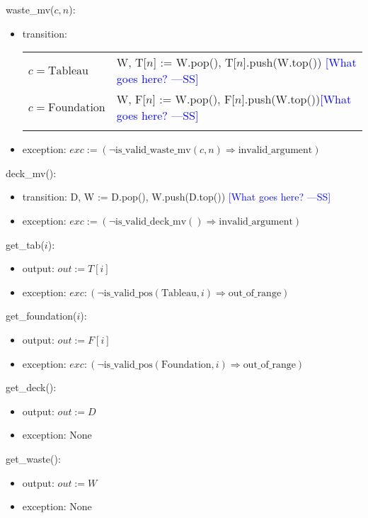 \documentclass[12pt]{article}
\newcommand{\authornote}[3]{\textcolor{#1}{[#3 ---#2]}}
\newcommand{\authornote}[3]{}
\newcommand{\wss}[1]{\authornote{blue}{SS}{#1}}
\begin{document}
\noindent waste\_mv($c, n$):
\begin{itemize}
\item transition:

\begin{tabular}{|p{3cm}|l|}
\hhline{|-|-|}
$c = \mbox{Tableau}$ & W, T[$n$] := W.pop(), T[$n$].push(W.top()) \wss{What goes here?}\\
\hhline{|-|-|}
$c = \mbox{Foundation}$ & W, F[$n$] := W.pop(), F[$n$].push(W.top())\wss{What goes here?}\\
\hhline{|-|-|}
\end{tabular}

\item exception:
  $exc := (\neg \text{is\_valid\_waste\_mv}(c, n) \Rightarrow
  \text{invalid\_argument})$

\end{itemize}

\noindent deck\_mv():
\begin{itemize}
\item transition: D, W := D.pop(), W.push(D.top()) \wss{What goes here?}
\item exception:
  $exc := (\neg \text{is\_valid\_deck\_mv}() \Rightarrow \text{invalid\_argument})$
\end{itemize}

\noindent get\_tab($i$):
\begin{itemize}
\item output: $out := T[i]$
\item exception: $exc : (\neg \text{is\_valid\_pos}(\text{Tableau}, i) \Rightarrow \text{out\_of\_range})$
\end{itemize}

\noindent get\_foundation($i$):
\begin{itemize}
\item output: $out := F[i]$
\item exception: $exc : (\neg \text{is\_valid\_pos}(\text{Foundation}, i) \Rightarrow \text{out\_of\_range})$
\end{itemize}

\noindent get\_deck():
\begin{itemize}
\item output: $out := D$
\item exception: None
\end{itemize}

\noindent get\_waste():
\begin{itemize}
\item output: $out := W$
\item exception: None
\end{itemize}
\end{document}
